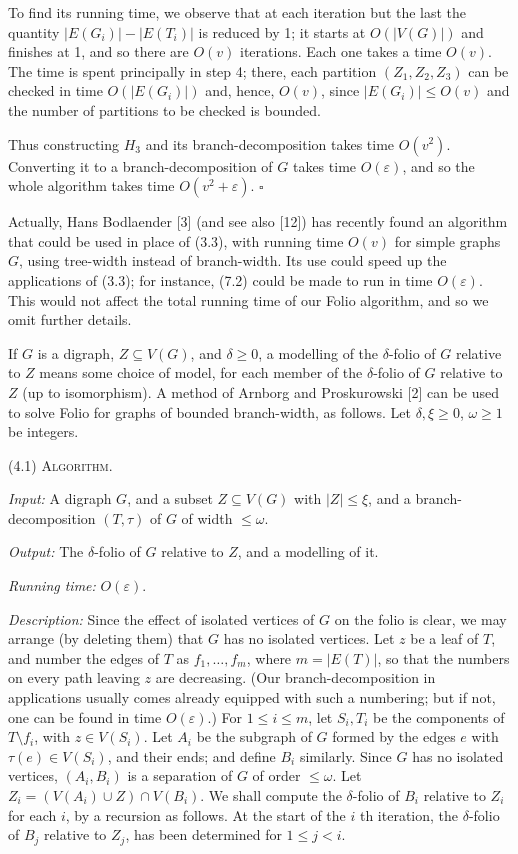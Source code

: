To find its running time, we observe that at each iteration but the last the quantity $|E(G_i)| - |E(T_i)|$ is reduced by 1; it starts at $O(|V(G)|)$ and finishes at 1, and so there are $O(v)$ iterations. Each one takes a time $O(v)$. The time is spent principally in step 4; there, each partition $(Z_1, Z_2, Z_3)$ can be checked in time $O(|E(G_i)|)$ and, hence, $O(v)$, since $|E(G_i)| \le O(v)$ and the number of partitions to be checked is bounded.

Thus constructing $H_3$ and its branch-decomposition takes time $O(v^2)$. Converting it to a branch-decomposition of $G$ takes time $O(\varepsilon)$, and so the whole algorithm takes time $O(v^2 + \varepsilon)$. $\square$

Actually, Hans Bodlaender [3] (and see also [12]) has recently found an algorithm that could be used in place of (3.3), with running time $O(v)$ for simple graphs $G$, using tree-width instead of branch-width. Its use could speed up the applications of (3.3); for instance, (7.2) could be made to run in time $O(\varepsilon)$. This would not affect the total running time of our Folio algorithm, and so we omit further details.


If $G$ is a digraph, $Z \subseteq V(G)$, and $\delta \ge 0$, a modelling of the $\delta$-folio of $G$ relative to $Z$ means some choice of model, for each member of the $\delta$-folio of $G$ relative to $Z$ (up to isomorphism). A method of Arnborg and Proskurowski [2] can be used to solve Folio for graphs of bounded branch-width, as follows. Let $\delta, \xi \ge 0$, $\omega \ge 1$ be integers.

\stmt
(4.1) \textsc{Algorithm}.

\textit{Input:} A digraph $G$, and a subset $Z \subseteq V(G)$ with $|Z| \le \xi$, and a branch-decomposition $(T, \tau)$ of $G$ of width $\le \omega$.

\textit{Output:} The $\delta$-folio of $G$ relative to $Z$, and a modelling of it.

\textit{Running time:} $O(\varepsilon)$.

\textit{Description:} Since the effect of isolated vertices of $G$ on the folio is clear, we may arrange (by deleting them) that $G$ has no isolated vertices. Let $z$ be a leaf of $T$, and number the edges of $T$ as $f_1, \dots, f_m$, where $m = |E(T)|$, so that the numbers on every path leaving $z$ are decreasing. (Our branch-decomposition in applications usually comes already equipped with such a numbering; but if not, one can be found in time $O(\varepsilon)$.) For $1 \le i \le m$, let $S_i, T_i$ be the components of $T \setminus f_i$, with $z \in V(S_i)$. Let $A_i$ be the subgraph of $G$ formed by the edges $e$ with $\tau(e) \in V(S_i)$, and their ends; and define $B_i$ similarly. Since $G$ has no isolated vertices, $(A_i, B_i)$ is a separation of $G$ of order $\le \omega$. Let $Z_i = (V(A_i) \cup Z) \cap V(B_i)$. We shall compute the $\delta$-folio of $B_i$ relative to $Z_i$ for each $i$, by a recursion as follows. At the start of the $i$ th iteration, the $\delta$-folio of $B_j$ relative to $Z_j$, has been determined for $1 \le j < i$.
